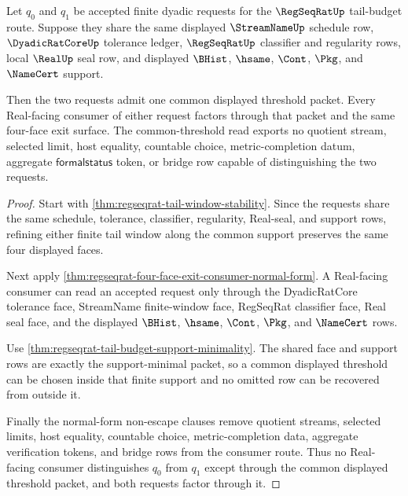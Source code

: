 \begin{theorem}
\label{thm:regseqrat-tail-budget-common-threshold-exhaustion}
Let $q_{0}$ and $q_{1}$ be accepted finite dyadic requests for the $\RegSeqRatUp$ tail-budget route. Suppose they share the same displayed $\StreamNameUp$ schedule row, $\DyadicRatCoreUp$ tolerance ledger, $\RegSeqRatUp$ classifier and regularity rows, local $\RealUp$ seal row, and displayed $\BHist$, $\hsame$, $\Cont$, $\Pkg$, and $\NameCert$ support.

Then the two requests admit one common displayed threshold packet. Every Real-facing consumer of either request factors through that packet and the same four-face exit surface. The common-threshold read exports no quotient stream, selected limit, host equality, countable choice, metric-completion datum, aggregate $\mathsf{formalstatus}$ token, or bridge row capable of distinguishing the two requests.
\end{theorem}
\begin{proof}
Start with \autoref{thm:regseqrat-tail-window-stability}. Since the requests share the same schedule, tolerance, classifier, regularity, Real-seal, and support rows, refining either finite tail window along the common support preserves the same four displayed faces.

Next apply \autoref{thm:regseqrat-four-face-exit-consumer-normal-form}. A Real-facing consumer can read an accepted request only through the DyadicRatCore tolerance face, StreamName finite-window face, RegSeqRat classifier face, Real seal face, and the displayed $\BHist$, $\hsame$, $\Cont$, $\Pkg$, and $\NameCert$ rows.

Use \autoref{thm:regseqrat-tail-budget-support-minimality}. The shared face and support rows are exactly the support-minimal packet, so a common displayed threshold can be chosen inside that finite support and no omitted row can be recovered from outside it.

Finally the normal-form non-escape clauses remove quotient streams, selected limits, host equality, countable choice, metric-completion data, aggregate verification tokens, and bridge rows from the consumer route. Thus no Real-facing consumer distinguishes $q_{0}$ from $q_{1}$ except through the common displayed threshold packet, and both requests factor through it.
\end{proof}
